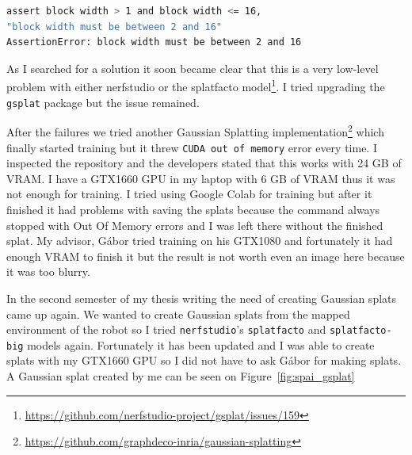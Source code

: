 \FloatBarrier
\begin{lstlisting}[language=bash,frame=single,float=!ht]
assert block width > 1 and block width <= 16, 
"block width must be between 2 and 16"
AssertionError: block width must be between 2 and 16
\end{lstlisting}

As I searched for a solution it soon became clear that this is a very low-level problem with either nerfstudio or the splatfacto model\footnote{\url{https://github.com/nerfstudio-project/gsplat/issues/159}}. I tried upgrading the \verb|gsplat| package but the issue remained.

After the failures we tried another Gaussian Splatting implementation\footnote{\url{https://github.com/graphdeco-inria/gaussian-splatting}} which finally started training but it threw \verb|CUDA out of memory| error every time. I inspected the repository and the developers stated that this works with 24 GB of VRAM. I have a GTX1660 GPU in my laptop with 6 GB of VRAM thus it was not enough for training. I tried using Google Colab for training but after it finished it had problems with saving the splats because the command always stopped with Out Of Memory errors and I was left there without the finished splat. My advisor, Gábor tried training on his GTX1080 and fortunately it had enough VRAM to finish it but the result is not worth even an image here because it was too blurry.

In the second semester of my thesis writing the need of creating Gaussian splats came up again. We wanted to create Gaussian splats from the mapped environment of the robot so I tried \verb|nerfstudio|'s \verb|splatfacto| and \verb|splatfacto-big| models again. Fortunately it has been updated and I was able to create splats with my GTX1660 GPU so I did not have to ask Gábor for making splats. A Gaussian splat created by me can be seen on Figure~\ref{fig:spai_gsplat}
